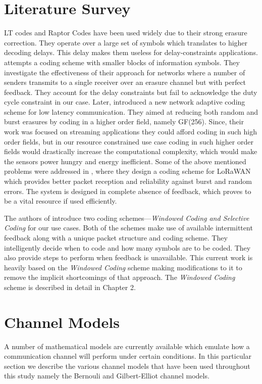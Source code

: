 \newpage
\section{Literature Survey}
\label{LiteratureSurvey}
LT codes \cite{ltcode} and Raptor Codes \cite{raptor} have been used widely due to their strong erasure correction. They operate over a large set of symbols which translates to higher decoding delays. This delay makes them useless for delay-constraints applications. \cite{DRINEA2013100} attempts a coding scheme with smaller blocks of information symbols. They investigate the effectiveness of their approach for networks where a number of senders transmits to a single receiver over an erasure channel but with perfect feedback. They account for the delay constraints but fail to acknowledge the duty cycle constraint in our case. Later,\cite{Fong} introduced a new network adaptive coding scheme for low latency communication. They aimed at reducing both random and burst erasures by coding in a higher order field, namely GF(256). Since, their work was focused on streaming applications they could afford coding in such high order fields, but in our resource constrained use case coding in such higher order fields would drastically increase the computational complexity, which would make the sensors power hungry and energy inefficient. Some of the above mentioned problems were addressed in \cite{DaRe}, where they design a coding scheme for LoRaWAN which provides better packet reception and reliability against burst and random errors. The system is designed in complete absence of feedback, which proves to be a vital resource if used efficiently.

The authors of \cite{borkotokyicc} introduce two coding schemes---\textit{Windowed Coding and Selective Coding} for our use cases. Both of the schemes make use of available intermittent feedback along with a unique packet structure and coding scheme. They intelligently decide when to code and how many symbols are to be coded. They also provide steps to perform when feedback is unavailable. This current work is heavily based on the \textit{Windowed Coding} scheme making modifications to it to remove the implicit shortcomings of that approach. The \textit{Windowed Coding} scheme is described in detail in Chapter 2.

\newpage
\section{Channel Models}
\label{ChannelModels}
A number of mathematical models are currently available which emulate how a communication channel will perform under certain conditions. In this particular section we describe the various channel models that have been used throughout this study namely the Bernouli and Gilbert-Elliot channel models.

